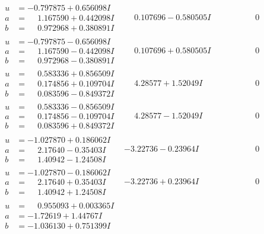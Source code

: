 \documentclass[1p]{elsarticle_modified}
\theoremstyle{definition}
\begin{document}
$$\begin{array}{c|c|c}
\begin{aligned}
u &= -0.797875 + 0.656098 I \\
a &= \phantom{-}1.167590 + 0.442098 I \\
b &= \phantom{-}0.972968 + 0.380891 I\end{aligned}
 & \phantom{-}0.107696 - 0.580505 I & \phantom{-0.000000 } 0 \\ \hline\begin{aligned}
u &= -0.797875 - 0.656098 I \\
a &= \phantom{-}1.167590 - 0.442098 I \\
b &= \phantom{-}0.972968 - 0.380891 I\end{aligned}
 & \phantom{-}0.107696 + 0.580505 I & \phantom{-0.000000 } 0 \\ \hline\begin{aligned}
u &= \phantom{-}0.583336 + 0.856509 I \\
a &= \phantom{-}0.174856 + 0.109704 I \\
b &= \phantom{-}0.083596 - 0.849372 I\end{aligned}
 & \phantom{-}4.28577 + 1.52049 I & \phantom{-0.000000 } 0 \\ \hline\begin{aligned}
u &= \phantom{-}0.583336 - 0.856509 I \\
a &= \phantom{-}0.174856 - 0.109704 I \\
b &= \phantom{-}0.083596 + 0.849372 I\end{aligned}
 & \phantom{-}4.28577 - 1.52049 I & \phantom{-0.000000 } 0 \\ \hline\begin{aligned}
u &= -1.027870 + 0.186062 I \\
a &= \phantom{-}2.17640 - 0.35403 I \\
b &= \phantom{-}1.40942 - 1.24508 I\end{aligned}
 & -3.22736 - 0.23964 I & \phantom{-0.000000 } 0 \\ \hline\begin{aligned}
u &= -1.027870 - 0.186062 I \\
a &= \phantom{-}2.17640 + 0.35403 I \\
b &= \phantom{-}1.40942 + 1.24508 I\end{aligned}
 & -3.22736 + 0.23964 I & \phantom{-0.000000 } 0 \\ \hline\begin{aligned}
u &= \phantom{-}0.955093 + 0.003365 I \\
a &= -1.72619 + 1.44767 I \\
b &= -1.036130 + 0.751399 I\end{aligned}

\end{array}$$
\end{document}
